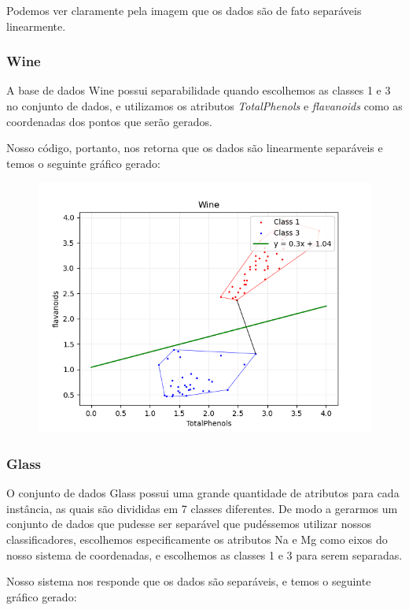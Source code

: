 \documentclass{article}
\begin{document}
Podemos ver claramente pela imagem que os dados são de fato separáveis linearmente.

\subsubsection{Wine}

A base de dados Wine possui separabilidade quando escolhemos as classes 1 e 3 no conjunto de dados, e utilizamos os atributos \textit{TotalPhenols} e \textit{flavanoids} como as coordenadas dos pontos que serão gerados.

Nosso código, portanto, nos retorna que os dados são linearmente separáveis e temos o seguinte gráfico gerado:

\begin{figure} [H]
	\includegraphics[width=12cm]{wine.png}
	\centering
\end{figure}

\subsubsection{Glass}

O conjunto de dados Glass possui uma grande quantidade de atributos para cada instância, as quais são divididas em 7 classes diferentes. De modo a gerarmos um conjunto de dados que pudesse ser separável que pudéssemos utilizar nossos classificadores, escolhemos especificamente os atributos Na e Mg como eixos do nosso sistema de coordenadas, e escolhemos as classes 1 e 3 para serem separadas.

Nosso sistema nos responde que os dados são separáveis, e temos o seguinte gráfico gerado:
\end{document}
